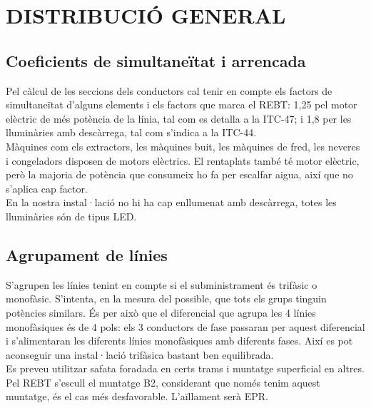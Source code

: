 \chapter{\uppercase{Distribució general}}
\section{Coeficients de simultaneïtat i arrencada}
Pel càlcul de les seccions dels conductors cal tenir en compte els factors de simultaneïtat d'alguns elements i els factors que marca el REBT: 1,25 pel motor elèctric de més potència de la línia, tal com es detalla a la ITC-47; i 1,8 per les lluminàries amb descàrrega, tal com s'indica a la ITC-44.\\
\newline Màquines com els extractors, les màquines buit, les màquines de fred, les neveres i congeladors disposen de motors elèctrics. El rentaplats també té motor elèctric, però la majoria de potència que consumeix ho fa per escalfar aigua, així que no s'aplica cap factor.\\
\newline En la nostra instal·lació no hi ha cap enllumenat amb descàrrega, totes les lluminàries són de tipus LED.
%
%
%
%
\section{Agrupament de línies}
S'agrupen les línies tenint en compte si el subministrament és trifàsic o monofàsic. S'intenta, en la mesura del possible, que tots els grups tinguin potències similars. És per això que el diferencial que agrupa les 4 línies monofàsiques és de 4 pols: els 3 conductors de fase passaran per aquest diferencial i s'alimentaran les diferents línies monofàsiques amb diferents fases. Així es pot aconseguir una instal·lació trifàsica bastant ben equilibrada.\\
\newline Es preveu utilitzar safata foradada en certs trams i muntatge superficial en altres. Pel REBT s'escull el muntatge B2, considerant que només tenim aquest muntatge, és el cas més desfavorable. L'aïllament serà EPR.
%
